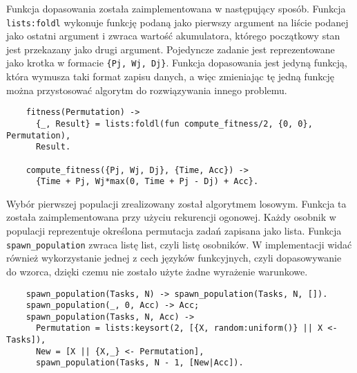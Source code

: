   Funkcja dopasowania została zaimplementowana w następujący sposób.
  Funkcja \texttt{lists:foldl} wykonuje funkcję podaną jako pierwszy argument na
  liście podanej jako ostatni argument i zwraca wartość akumulatora, którego
  początkowy stan jest przekazany jako drugi argument. Pojedyncze zadanie jest
  reprezentowane jako krotka w formacie \texttt{\{Pj, Wj, Dj\}}. Funkcja
  dopasowania jest jedyną funkcją, która wymusza taki format zapisu danych, a
  więc zmieniając tę jedną funkcję można przystosować algorytm do rozwiązywania
  innego problemu.
  \singlespacing
  \begin{center}
  \begin{verbatim}
    fitness(Permutation) ->
      {_, Result} = lists:foldl(fun compute_fitness/2, {0, 0}, Permutation),
      Result.

    compute_fitness({Pj, Wj, Dj}, {Time, Acc}) ->
      {Time + Pj, Wj*max(0, Time + Pj - Dj) + Acc}.
  \end{verbatim}
  \end{center}
  \onehalfspacing
  \vspace{1em}

  Wybór pierwszej populacji zrealizowany został algorytmem losowym. Funkcja ta
  została zaimplementowana przy użyciu rekurencji ogonowej. Każdy osobnik w
  populacji reprezentuje określona permutacja zadań zapisana jako lista. Funkcja
  \texttt{spawn\_population} zwraca listę list, czyli listę osobników. W
  implementacji widać również wykorzystanie jednej z cech języków funkcyjnych,
  czyli dopasowywanie do wzorca, dzięki czemu nie zostało użyte żadne wyrażenie
  warunkowe.
  \singlespacing
  \begin{center}
  \begin{verbatim}
    spawn_population(Tasks, N) -> spawn_population(Tasks, N, []).
    spawn_population(_, 0, Acc) -> Acc;
    spawn_population(Tasks, N, Acc) ->
      Permutation = lists:keysort(2, [{X, random:uniform()} || X <- Tasks]),
      New = [X || {X,_} <- Permutation],
      spawn_population(Tasks, N - 1, [New|Acc]).
  \end{verbatim}
  \end{center}
  \onehalfspacing
  \vspace{1em}


